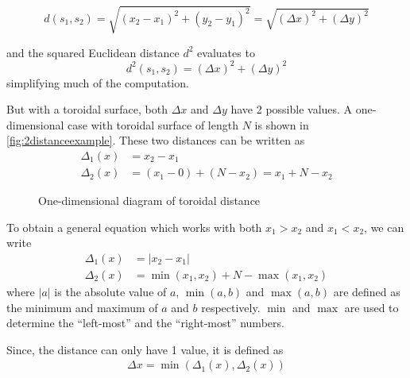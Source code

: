 \begin{equation}
    \label{eq:euclid}
    d(s_1,s_2)=\sqrt{(x_2-x_1)^2+(y_2-y_1)^2}=\sqrt{(\Delta x)^2+(\Delta y)^2}
\end{equation}

and the squared Euclidean distance $d^2$ evaluates to
\begin{equation}
    d^2(s_1,s_2)=(\Delta x)^2+(\Delta y)^2
    \label{eq:squaredEuclid}
\end{equation}
simplifying much of the computation.

But with a toroidal surface, both $\Delta x$ and $\Delta y$ have 2 possible values. A one-dimensional case with toroidal surface of length $N$ is shown in \autoref{fig:2distanceexample}. These two distances can be written as
\begin{align*}
    \Delta_1(x)&=x_2-x_1 \\
    \Delta_2(x)&=(x_1-0)+(N-x_2)=x_1+N-x_2
\end{align*}

\begin{figure}[tpb]
    \centering
    \caption{One-dimensional diagram of toroidal distance}%
    \label{fig:2distanceexample}
\end{figure}


To obtain a general equation which works with both $x_1>x_2$ and $x_1<x_2$, we can write
\begin{align*}
    \Delta_1(x)&=\lvert x_2-x_1 \rvert \\
    \Delta_2(x)&=\min{(x_1,x_2)}+N-\max{(x_1,x_2)}
\end{align*}
where $\lvert a\rvert$ is the absolute value of $a$, $\min{(a,b)}$ and $\max{(a,b)}$ are defined as the minimum and maximum of $a$ and $b$ respectively. $\min$ and $\max$ are used to determine the  ``left-most'' and the ``right-most'' numbers.

Since, the distance can only have 1 value, it is defined as
\begin{align*}
    \Delta x=\min{(\Delta_1(x),\Delta_2(x))}
\end{align*}

